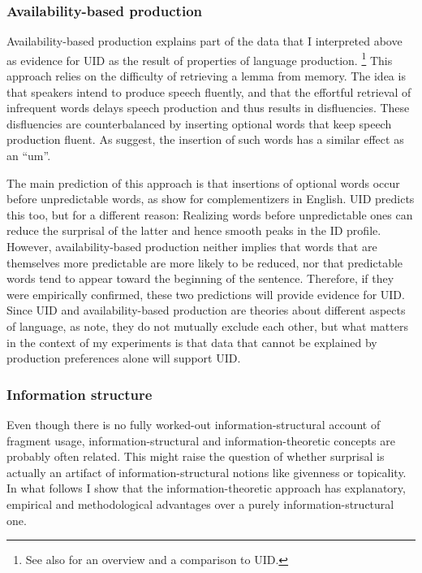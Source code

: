 \subsubsection{Availability-based production}
\label{sec:infotheory-uid-competing-abp}

Availability-based production \citep[e.g.][]{bock1987, ferreira.dell2000} explains part of the data that I interpreted above as evidence for UID as the result of properties of language production.%
%
\footnote{See also \citet{jaeger.buz2017} for an overview and a comparison to UID.}\afterfn%
% 
This approach relies on the difficulty of retrieving a lemma from memory. The idea is that speakers intend to produce speech fluently, and that the effortful retrieval of infrequent words delays speech production and thus results in disfluencies. These disfluencies are counterbalanced by inserting optional words that keep speech production fluent. As \citet[299]{ferreira.dell2000} suggest, the insertion of such words has a similar effect as an ``um''.

The main prediction of this approach is that insertions of optional words occur before unpredictable words, as \citet{ferreira.dell2000} show for complementizers in English. UID predicts this too, but for a different reason: Realizing words before unpredictable ones can reduce the surprisal of the latter and hence smooth peaks in the ID profile. However, availability-based production neither implies that words that are themselves more predictable are more likely to be reduced, nor that predictable words tend to appear toward the beginning of the sentence. Therefore, if they were empirically confirmed, these two predictions will provide evidence for UID. Since UID and availability-based production are theories about different aspects of language, as \citet{jaeger.buz2017} note, they do not mutually exclude each other, but what matters in the context of my experiments is that data that cannot be explained by production preferences alone will support UID.

\subsubsection{Information structure}
Even though there is no fully worked-out information-structural account of fragment usage, information-structural and information-theoretic concepts are probably often related. This might raise the question of whether surprisal is actually an artifact of information-structural notions like givenness or topicality. In what follows I show that the information-theoretic approach has explanatory, empirical and methodological advantages over a purely information-structural one.


